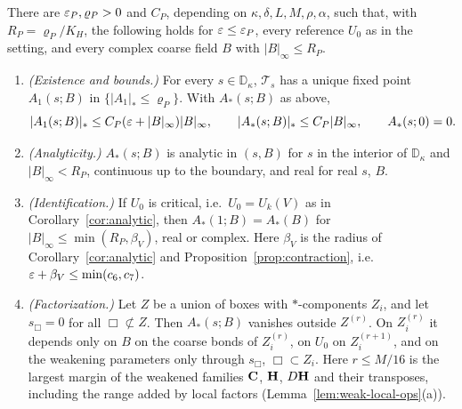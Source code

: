 \begin{theorem}\label{thm:weak-bg}
There are $\varepsilon_P,\varrho_P>0$ and $C_P$, depending on $\kappa,\delta,L,M,\rho,\alpha$, such that, with $R_P=\varrho_P/K_H$, the following holds for $\varepsilon\le\varepsilon_P$, every reference $U_0$ as in the setting, and every complex coarse field $B$ with $|B|_\infty\le R_P$.
\begin{enumerate}[label=(\alph*)]
\item \emph{(Existence and bounds.)} For every $s\in\mathbb D_\kappa$, $\mathcal T_s$ has a unique fixed point $A_1(s;B)$ in $\{|A_1|_*\le\varrho_P\}$. With $A_*(s;B)$ as above,
\[
|A_1(s;B)|_*\le C_P(\varepsilon+|B|_\infty)|B|_\infty,\qquad|A_*(s;B)|_*\le C_P|B|_\infty,\qquad A_*(s;0)=0 .
\]
\item \emph{(Analyticity.)} $A_*(s;B)$ is analytic in $(s,B)$ for $s$ in the interior of $\mathbb D_\kappa$ and $|B|_\infty<R_P$, continuous up to the boundary, and real for real $s$, $B$.
\item \emph{(Identification.)} If $U_0$ is critical, i.e.\ $U_0=U_k(V)$ as in Corollary~\ref{cor:analytic}, then $A_*(1;B)=A_*(B)$ for $|B|_\infty\le\min(R_P,\beta_V)$, real or complex. Here $\beta_V$ is the radius of Corollary~\ref{cor:analytic} and Proposition~\ref{prop:contraction}, i.e.\ $\varepsilon+\beta_V\le\min(c_6,c_7)$.
\item \emph{(Factorization.)} Let $Z$ be a union of boxes with $*$-components $Z_i$, and let $s_\Box=0$ for all $\Box\not\subset Z$. Then $A_*(s;B)$ vanishes outside $Z^{(r)}$. On $Z_i^{(r)}$ it depends only on $B$ on the coarse bonds of $Z_i^{(r)}$, on $U_0$ on $Z_i^{(r+1)}$, and on the weakening parameters only through $s_\Box$, $\Box\subset Z_i$. Here $r\le M/16$ is the largest margin of the weakened families $\mathbf C$, $\mathbf H$, $D\mathbf H$ and their transposes, including the range added by local factors (Lemma~\ref{lem:weak-local-ops}(a)).
\end{enumerate}
\end{theorem}

